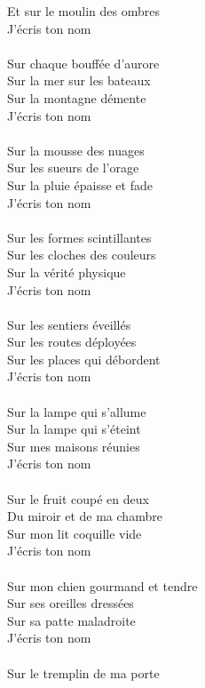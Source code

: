 Et sur le moulin des ombres \\
J\textquoteright écris ton nom \\
 \\
Sur chaque bouffée d\textquoteright aurore \\
Sur la mer sur les bateaux \\
Sur la montagne démente \\
J\textquoteright écris ton nom \\
 \\
Sur la mousse des nuages \\
Sur les sueurs de l\textquoteright orage \\
Sur la pluie épaisse et fade \\
J\textquoteright écris ton nom \\
 \\
Sur les formes scintillantes \\
Sur les cloches des couleurs \\
Sur la vérité physique \\
J\textquoteright écris ton nom \\
 \\
Sur les sentiers éveillés \\
Sur les routes déployées \\
Sur les places qui débordent \\
J\textquoteright écris ton nom \\
 \\
Sur la lampe qui s\textquoteright allume \\
Sur la lampe qui s\textquoteright éteint \\
Sur mes maisons réunies \\
J\textquoteright écris ton nom \\
 \\
Sur le fruit coupé en deux \\
Du miroir et de ma chambre \\
Sur mon lit coquille vide \\
J\textquoteright écris ton nom \\
 \\
 \newpage
 \noindent
Sur mon chien gourmand et tendre \\
Sur ses oreilles dressées \\
Sur sa patte maladroite \\
J\textquoteright écris ton nom \\
 \\
Sur le tremplin de ma porte \\
